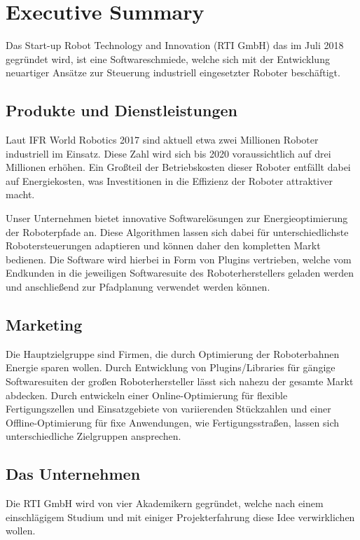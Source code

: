 \chapter{Executive Summary}

Das Start-up \textsf{Robot Technology and Innovation (RTI GmbH)} das im Juli 2018 gegründet wird, ist eine Softwareschmiede, welche sich mit der Entwicklung neuartiger Ansätze zur Steuerung industriell eingesetzter Roboter beschäftigt.

\section{Produkte und Dienstleistungen}

Laut IFR World Robotics 2017 sind aktuell etwa zwei Millionen Roboter industriell im Einsatz. Diese Zahl wird sich bis 2020 voraussichtlich auf drei Millionen erhöhen. Ein Großteil der Betriebskosten dieser Roboter entfällt dabei auf Energiekosten, was Investitionen in die Effizienz der Roboter attraktiver macht.

Unser Unternehmen bietet innovative Softwarelösungen zur Energieoptimierung der Roboterpfade an. Diese Algorithmen lassen sich dabei für unterschiedlichste Robotersteuerungen adaptieren und können daher den kompletten Markt bedienen. Die Software wird hierbei in Form von Plugins vertrieben, welche vom Endkunden in die jeweiligen Softwaresuite des Roboterherstellers geladen werden und anschließend zur Pfadplanung verwendet werden können.

\section{Marketing}

Die Hauptzielgruppe sind Firmen, die durch Optimierung der Roboterbahnen Energie sparen wollen. Durch Entwicklung von Plugins/Libraries für gängige Softwaresuiten der großen Roboterhersteller lässt sich nahezu der gesamte Markt abdecken. Durch entwickeln einer Online-Optimierung für flexible Fertigungszellen und Einsatzgebiete von variierenden Stückzahlen und einer Offline-Optimierung für fixe Anwendungen, wie Fertigungsstraßen, lassen sich unterschiedliche Zielgruppen ansprechen.

\section{Das Unternehmen}

Die \textsf{RTI GmbH} wird von vier Akademikern gegründet, welche nach einem einschlägigem Studium und mit einiger Projekterfahrung diese Idee verwirklichen wollen.

